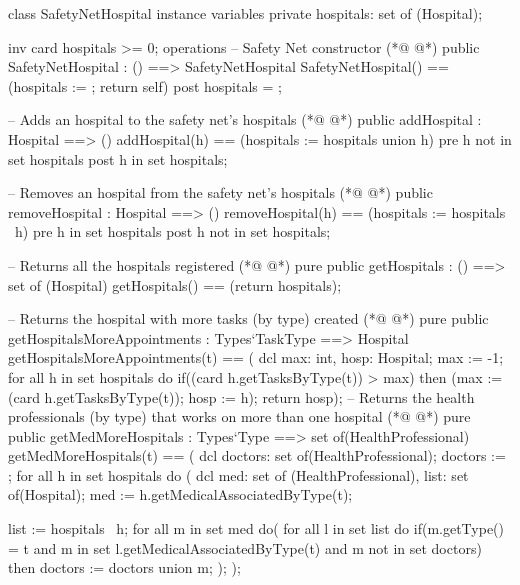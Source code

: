 \begin{vdmpp}[breaklines=true]
class SafetyNetHospital
instance variables
 private hospitals: set of (Hospital);
 
 inv card hospitals >= 0;
operations
 -- Safety Net constructor
(*@
\label{SafetyNetHospital:8}
@*)
 public SafetyNetHospital : () ==> SafetyNetHospital
  SafetyNetHospital() == (hospitals := {}; return self)
 post hospitals = {};
 
 -- Adds an hospital to the safety net's hospitals
(*@
\label{addHospital:13}
@*)
 public addHospital : Hospital ==> ()
  addHospital(h) == (hospitals := hospitals union {h})
 pre h not in set hospitals
 post h in set hospitals;
 
 -- Removes an hospital from the safety net's hospitals
(*@
\label{removeHospital:19}
@*)
 public removeHospital : Hospital ==> ()
  removeHospital(h) == (hospitals := hospitals \ {h})
 pre h in set hospitals
 post h not in set hospitals;
 
 -- Returns all the hospitals registered
(*@
\label{getHospitals:25}
@*)
 pure public getHospitals : () ==> set of (Hospital)
  getHospitals() == (return hospitals);
 
 -- Returns the hospital with more tasks (by type) created
(*@
\label{getHospitalsMoreAppointments:29}
@*)
 pure public getHospitalsMoreAppointments : Types`TaskType ==> Hospital
  getHospitalsMoreAppointments(t) == (
                    dcl max: int, hosp: Hospital;
                    max := -1;
                    for all h in set hospitals do
                     if((card h.getTasksByType(t)) > max)
                      then (max := (card h.getTasksByType(t)); hosp := h);
                    return hosp);
 -- Returns the health professionals (by type) that works on more than one hospital
(*@
\label{getMedMoreHospitals:38}
@*)
 pure public getMedMoreHospitals : Types`Type ==> set of(HealthProfessional)
  getMedMoreHospitals(t) == (
                  dcl doctors: set of(HealthProfessional);
                  doctors := {};
                  for all h in set hospitals do (
                   dcl med: set of (HealthProfessional), list: set of(Hospital);
                   med := h.getMedicalAssociatedByType(t);
                   
                   list := hospitals \ {h};
                   for all m in set med do(
                    for all l in set list do
                     if(m.getType() = t and m in set l.getMedicalAssociatedByType(t) and m not in set doctors)
                      then doctors := doctors union {m};
                   );
                  );
                  

\end{vdmpp}
